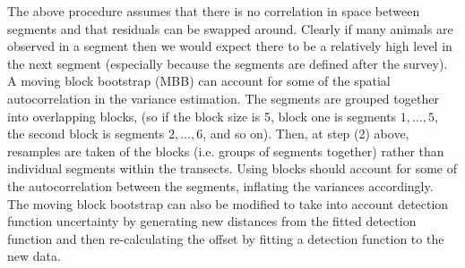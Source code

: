 \documentclass[a4paper,12pt]{article}
\begin{document}
The above procedure assumes that there is no correlation in space between segments and that residuals can be swapped around. Clearly if many animals are observed in a segment then we would expect there to be a relatively high level in the next segment (especially because the segments are defined after the survey). A moving block bootstrap (MBB) can account for some of the spatial autocorrelation in the variance estimation. The segments are grouped together into overlapping blocks, (so if the block size is 5, block one is segments $1,\ldots,5$, the second block is segments $2,\ldots,6$, and so on). Then, at step (2) above, resamples are taken of the blocks (i.e. groups of segments together) rather than individual segments within the transects. Using blocks should account for some of the autocorrelation between the segments, inflating the variances accordingly. The moving block bootstrap can also be modified to take into account detection function uncertainty by generating new distances from the fitted detection function and then re-calculating the offset by fitting a detection function to the new data.

\end{document}
